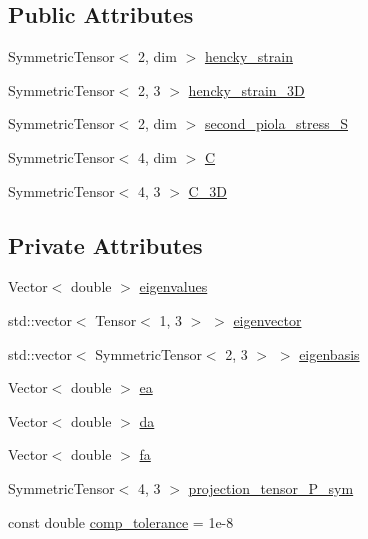 \subsection*{Public Attributes}
\begin{DoxyCompactItemize}
\item 
Symmetric\+Tensor$<$ 2, dim $>$ \hyperlink{classln__space_a2ccf220d438b7a29a53706167b102b5d}{hencky\+\_\+strain}
\item 
Symmetric\+Tensor$<$ 2, 3 $>$ \hyperlink{classln__space_a867cb10924f94e01595a67fdd456ecd4}{hencky\+\_\+strain\+\_\+3D}
\item 
Symmetric\+Tensor$<$ 2, dim $>$ \hyperlink{classln__space_a9827f6c10219014445a328c9972f89f7}{second\+\_\+piola\+\_\+stress\+\_\+S}
\item 
Symmetric\+Tensor$<$ 4, dim $>$ \hyperlink{classln__space_a03b61855dbad8c954ace5700ee4a3769}{C}
\item 
Symmetric\+Tensor$<$ 4, 3 $>$ \hyperlink{classln__space_a73ba46c443138c59b8eaa1c4561b7dc6}{C\+\_\+3D}
\end{DoxyCompactItemize}
\subsection*{Private Attributes}
\begin{DoxyCompactItemize}
\item 
Vector$<$ double $>$ \hyperlink{classln__space_aad33c1f308694e2801bbea7730d3b9c6}{eigenvalues}
\item 
std\+::vector$<$ Tensor$<$ 1, 3 $>$ $>$ \hyperlink{classln__space_ada3f56f8a97f974275c267ac172a0b40}{eigenvector}
\item 
std\+::vector$<$ Symmetric\+Tensor$<$ 2, 3 $>$ $>$ \hyperlink{classln__space_a1e67221edabbd2db69aa4a21262bd1f4}{eigenbasis}
\item 
Vector$<$ double $>$ \hyperlink{classln__space_add32551f879560be55f3d61a5a368ab4}{ea}
\item 
Vector$<$ double $>$ \hyperlink{classln__space_a8d65915eb5122e3c5941b7163af57306}{da}
\item 
Vector$<$ double $>$ \hyperlink{classln__space_aff1eab9675707d7aeed154aadb11adf4}{fa}
\item 
Symmetric\+Tensor$<$ 4, 3 $>$ \hyperlink{classln__space_a514a44d8b96a0cffeab11d39933299b5}{projection\+\_\+tensor\+\_\+\+P\+\_\+sym}
\item 
const double \hyperlink{classln__space_adb90c475844ad73f0ff8b40e80900180}{comp\+\_\+tolerance} = 1e-\/8
\end{DoxyCompactItemize}


